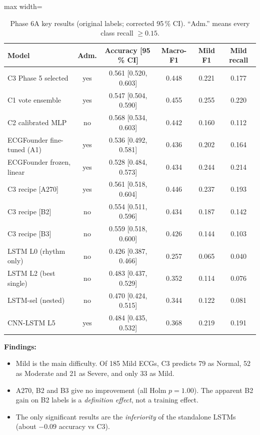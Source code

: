 \begin{table}[H]\centering\small
\caption{Phase 6A key results (original labels; corrected 95\,\% CI). ``Adm.'' means every class recall $\ge 0.15$.}\label{tab:p6a}
\begin{adjustbox}{max width=\linewidth}
\begin{tabular}{lccccc}\toprule
Model & Adm. & Accuracy [95\,\% CI] & Macro-F1 & Mild F1 & Mild recall \\\midrule
C3 Phase 5 selected & yes & 0.561 [0.520, 0.603] & 0.448 & 0.221 & 0.177 \\
C1 vote ensemble & yes & 0.547 [0.504, 0.590] & 0.455 & 0.255 & 0.220 \\
C2 calibrated MLP & no & 0.568 [0.534, 0.603] & 0.442 & 0.160 & 0.112 \\
ECGFounder fine-tuned (A1) & yes & 0.536 [0.492, 0.581] & 0.436 & 0.202 & 0.164 \\
ECGFounder frozen, linear & yes & 0.528 [0.484, 0.573] & 0.434 & 0.244 & 0.214 \\
C3 recipe [A270] & yes & 0.561 [0.518, 0.604] & 0.446 & 0.237 & 0.193 \\
C3 recipe [B2] & no & 0.554 [0.511, 0.596] & 0.434 & 0.187 & 0.142 \\
C3 recipe [B3] & no & 0.559 [0.518, 0.600] & 0.426 & 0.144 & 0.103 \\
LSTM L0 (rhythm only) & no & 0.426 [0.387, 0.466] & 0.257 & 0.065 & 0.040 \\
LSTM L2 (best single) & no & 0.483 [0.437, 0.529] & 0.352 & 0.114 & 0.076 \\
LSTM-sel (nested) & no & 0.470 [0.424, 0.515] & 0.344 & 0.122 & 0.081 \\
CNN-LSTM L5 & yes & 0.484 [0.435, 0.532] & 0.368 & 0.219 & 0.191 \\\bottomrule
\end{tabular}
\end{adjustbox}
\end{table}
\textbf{Findings:}
\begin{itemize}
  \item Mild is the main difficulty. Of 185 Mild ECGs, C3 predicts 79 as Normal, 52 as Moderate and 21 as Severe, and
    only 33 as Mild.
  \item A270, B2 and B3 give no improvement (all Holm $p=1.00$). The apparent B2 gain on B2 labels is a
    \emph{definition effect}, not a training effect.
  \item The only significant results are the \emph{inferiority} of the standalone LSTMs (about $-0.09$ accuracy vs C3).
\end{itemize}

